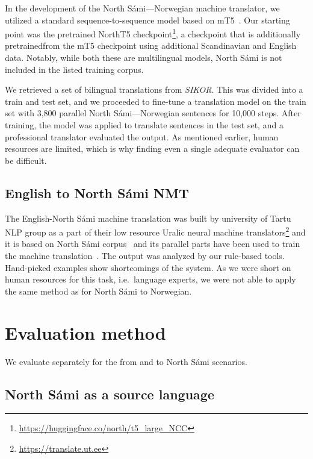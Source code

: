 \documentclass{flammie}
\begin{document}
In the development of the North Sámi---Norwegian machine translator, we utilized
a standard sequence-to-sequence model based on mT5~\cite{xue2020mt5}. Our
starting point was the pretrained NorthT5
checkpoint\footnote{\url{https://huggingface.co/north/t5_large_NCC}}, a
checkpoint that is additionally pretrainedfrom the mT5 checkpoint using
additional Scandinavian and English data. Notably, while both these are
multilingual models, North Sámi is not included in the listed training corpus.

We retrieved a set of bilingual translations from \textit{SIKOR}. This was
divided into a train and test set, and we proceeded to fine-tune a translation
model on the train set with 3,800 parallel North Sámi---Norwegian sentences for
10,000 steps. After training, the model was applied to translate sentences in
the test set, and a professional translator evaluated the output. As mentioned
earlier, human resources are limited, which is why finding even a single
adequate evaluator can be difficult.

\subsection{English to North Sámi NMT}\label{eng-sme}

The English-North Sámi machine translation was built by university of Tartu NLP
group as a part of their low resource Uralic neural machine
translators\footnote{\url{https://translate.ut.ee}} and it is based on North
Sámi corpus~\cite{sikor_06.11.2018} and its parallel parts have been used to
train the machine translation~\cite{yankovskaya-etal-2023-machine}.  The output
was analyzed by our rule-based tools. Hand-picked examples show shortcomings of
the system. As we were short on human resources for this task, i.e.\ language
experts,  we were not able to apply the same method as for North Sámi to
Norwegian.

\section{Evaluation method}

We evaluate separately for the from and to North Sámi scenarios.

\subsection{North Sámi as a source language}
\end{document}
